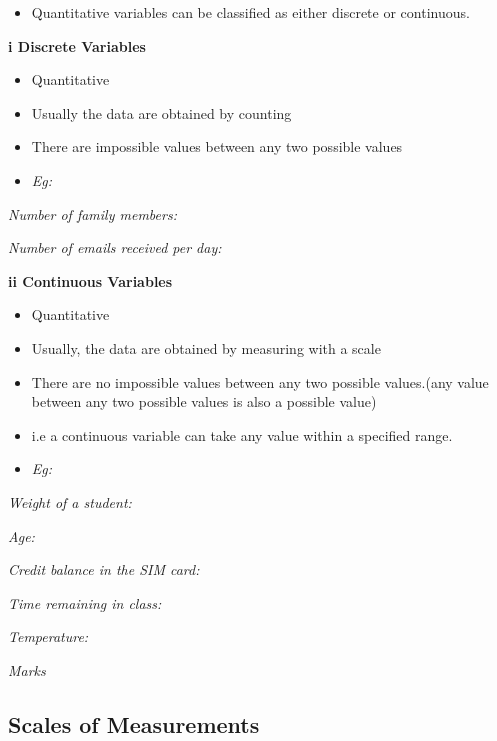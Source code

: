 \documentclass[]{book}
\providecommand{\tightlist}{%
  \setlength{\itemsep}{0pt}\setlength{\parskip}{0pt}}
\begin{document}
\begin{itemize}
\tightlist
\item
  Quantitative variables can be classified as either discrete or continuous.
\end{itemize}

\textbf{i Discrete Variables}

\begin{itemize}
\tightlist
\item
  Quantitative
\item
  Usually the data are obtained by counting
\item
  There are impossible values between any two possible values
\item
  \emph{Eg:}
\end{itemize}

\emph{Number of family members:}

\emph{Number of emails received per day:}

\textbf{ii Continuous Variables}

\begin{itemize}
\tightlist
\item
  Quantitative
\item
  Usually, the data are obtained by measuring with a scale
\item
  There are no impossible values between any two possible values.(any value between any two possible values is also a possible value)
\item
  i.e a continuous variable can take any value within a specified range.
\item
  \emph{Eg:}
\end{itemize}

\emph{Weight of a student:}

\emph{Age:}

\emph{Credit balance in the SIM card:}

\emph{Time remaining in class:}

\emph{Temperature:}

\emph{Marks}

\hypertarget{scales-of-measurements}{%
\subsection{Scales of Measurements}\label{scales-of-measurements}}
\end{document}
